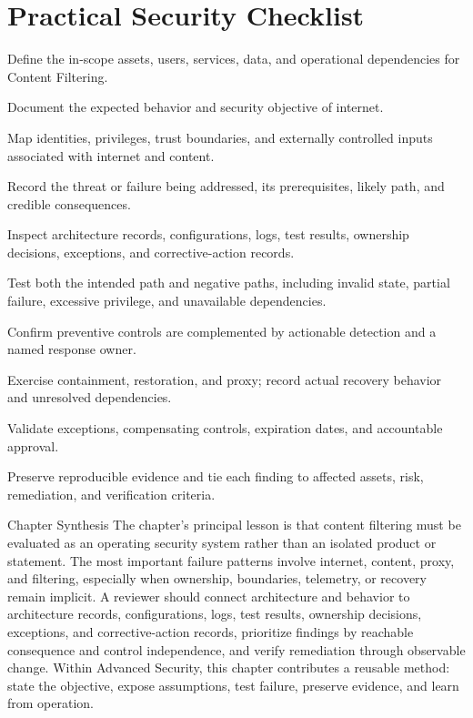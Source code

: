 \documentclass[11pt,letterpaper]{article}
\begin{document}
\section*{Practical Security Checklist}
\begin{CornellChecklist}
\item Define the in-scope assets, users, services, data, and operational dependencies for Content Filtering.
\item Document the expected behavior and security objective of internet.
\item Map identities, privileges, trust boundaries, and externally controlled inputs associated with internet and content.
\item Record the threat or failure being addressed, its prerequisites, likely path, and credible consequences.
\item Inspect architecture records, configurations, logs, test results, ownership decisions, exceptions, and corrective-action records.
\item Test both the intended path and negative paths, including invalid state, partial failure, excessive privilege, and unavailable dependencies.
\item Confirm preventive controls are complemented by actionable detection and a named response owner.
\item Exercise containment, restoration, and proxy; record actual recovery behavior and unresolved dependencies.
\item Validate exceptions, compensating controls, expiration dates, and accountable approval.
\item Preserve reproducible evidence and tie each finding to affected assets, risk, remediation, and verification criteria.
\end{CornellChecklist}
\begin{CornellSummaryBox}{Chapter Synthesis}
The chapter's principal lesson is that content filtering must be evaluated as an operating security system rather than an isolated product or statement. The most important failure patterns involve internet, content, proxy, and filtering, especially when ownership, boundaries, telemetry, or recovery remain implicit. A reviewer should connect architecture and behavior to architecture records, configurations, logs, test results, ownership decisions, exceptions, and corrective-action records, prioritize findings by reachable consequence and control independence, and verify remediation through observable change. Within Advanced Security, this chapter contributes a reusable method: state the objective, expose assumptions, test failure, preserve evidence, and learn from operation.
\end{CornellSummaryBox}
\end{document}
